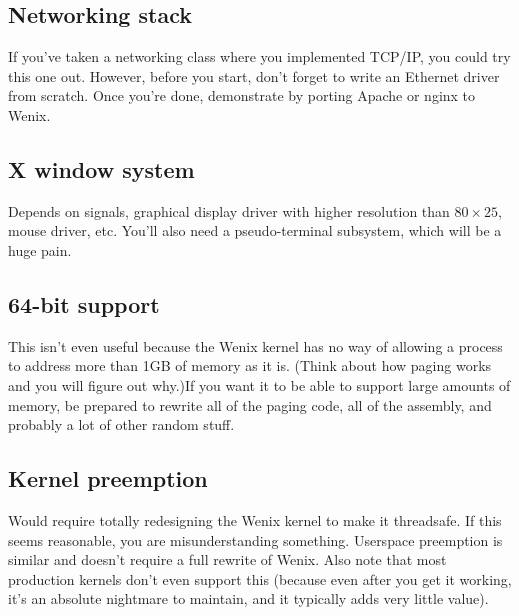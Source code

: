 \subsection{Networking stack}
If you've taken a networking class where you implemented TCP/IP, you could try this one out. However, before you start, don't forget to write an Ethernet driver from scratch. Once you're done, demonstrate by porting Apache or nginx to Wenix.
\subsection{X window system}
Depends on signals, graphical display driver with higher resolution than $80 \times 25$, mouse driver, etc. You'll also need a pseudo-terminal subsystem, which will be a huge pain.
\subsection{64-bit support}
This isn't even useful because the Wenix kernel has no way of allowing a process to address more than 1GB of memory as it is. (Think about how paging works and you will figure out why.)If you want it to be able to support large amounts of memory, be prepared to rewrite all of the paging code, all of the assembly, and probably a lot of other random stuff.
\subsection{Kernel preemption}
Would require totally redesigning the Wenix kernel to make it threadsafe. If this seems reasonable, you are misunderstanding something. Userspace preemption is similar and doesn't require a full rewrite of Wenix. Also note that most production kernels don't even support this (because even after you get it working, it's an absolute nightmare to maintain, and it typically adds very little value). %
 
